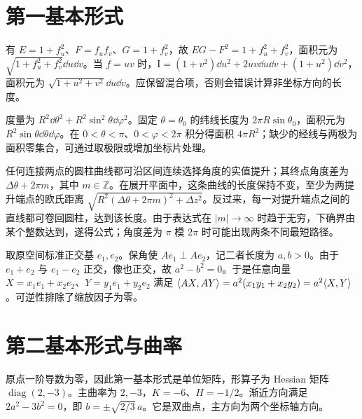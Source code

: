 \section{第一基本形式}
\begin{solve}
有 $E=1+f_u^2$、$F=f_uf_v$、$G=1+f_v^2$，故 $EG-F^2=1+f_u^2+f_v^2$，面积元为 $\sqrt{1+f_u^2+f_v^2}\dd u\dd v$。当 $f=uv$ 时，$\mathrm I=(1+v^2)\dd u^2+2uv\dd u\dd v+(1+u^2)\dd v^2$，面积元为 $\sqrt{1+u^2+v^2}\dd u\dd v$。应保留混合项，否则会错误计算非坐标方向的长度。
\end{solve}

\begin{solve}
度量为 $R^2\dd\theta^2+R^2\sin^2\theta\dd\varphi^2$。固定 $\theta=\theta_0$ 的纬线长度为 $2\pi R\sin\theta_0$，面积元为 $R^2\sin\theta\dd\theta\dd\varphi$。在 $0<\theta<\pi$、$0<\varphi<2\pi$ 积分得面积 $4\pi R^2$；缺少的经线与两极为面积零集合，可通过取极限或增加坐标片处理。
\end{solve}

\begin{solve}
任何连接两点的圆柱曲线都可沿区间连续选择角度的实值提升；其终点角度差为 $\Delta\theta+2\pi m$，其中 $m\in\mathbb Z$。在展开平面中，这条曲线的长度保持不变，至少为两提升端点的欧氏距离 $\sqrt{R^2(\Delta\theta+2\pi m)^2+\Delta z^2}$。反过来，每一对提升端点之间的直线都可卷回圆柱，达到该长度。由于表达式在 $|m|\to\infty$ 时趋于无穷，下确界由某个整数达到，遂得公式；角度差为 $\pi$ 模 $2\pi$ 时可能出现两条不同最短路径。
\end{solve}

\begin{solve}
取原空间标准正交基 $e_1,e_2$。保角使 $Ae_1\perp Ae_2$，记二者长度为 $a,b>0$。由于 $e_1+e_2$ 与 $e_1-e_2$ 正交，像也正交，故 $a^2-b^2=0$。于是任意向量 $X=x_1e_1+x_2e_2$、$Y=y_1e_1+y_2e_2$ 满足 $\langle AX,AY\rangle=a^2(x_1y_1+x_2y_2)=a^2\langle X,Y\rangle$。可逆性排除了缩放因子为零。
\end{solve}

\section{第二基本形式与曲率}
\begin{solve}
原点一阶导数为零，因此第一基本形式是单位矩阵，形算子为 Hessian 矩阵 $\operatorname{diag}(2,-3)$。主曲率为 $2,-3$，$K=-6$、$H=-1/2$。渐近方向满足 $2a^2-3b^2=0$，即 $b=\pm\sqrt{2/3}\,a$。它是双曲点，主方向为两个坐标轴方向。
\end{solve}

